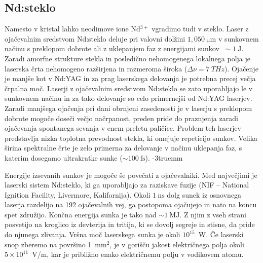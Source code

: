 \subsection{Nd:steklo}
Namesto v kristal lahko neodimove ione Nd$^{3+}$ vgradimo tudi v steklo. 
Laser z ojačevalnim sredstvom Nd:steklo  deluje 
pri valovni dolžini $1,050~\si{\micro\meter}$ v sunkovnem načinu 
s preklopom dobrote ali z uklepanjem faz z energijami sunkov $~\sim 1~\si{\joule}$.
Zaradi amorfne strukture stekla in posledično 
nehomogenega lokalnega polja je laserska črta nehomogeno razširjena in razmeroma široka
($\Delta \nu = 7~\si{THz}$).
Ojačenje je manjše kot v Nd:YAG in za prag laserskega delovanja je
potrebna precej večja črpalna moč. Laserji z ojačevalnim sredstvom Nd:steklo se zato uporabljajo le v 
sunkovnem načinu in za tako delovanje so celo primernejši od Nd:YAG laserjev.
Zaradi manjšega ojačenja pri dani obrnjeni zasedenosti 
je v laserju s preklopom dobrote mogoče doseči večjo načrpanost, preden pride do praznjenja
zaradi ojačevanja spontanega sevanja v enem preletu paličice. Problem teh laserjev
predstavlja nizka toplotna prevodnost stekla, ki omejuje repeticijo sunkov.
Velika širina spektralne črte je zelo primerna za delovanje v načinu uklepanja faz, s 
katerim dosegamo ultrakratke sunke ($\sim 100~\si{\femto\second}$). 
\vglue-3truemm
\begin{remark}
Energije izsevanih sunkov je mogoče še povečati z ojačevalniki. Med največjimi je
laserski sistem Nd:steklo, ki ga uporabljajo za raziskave fuzije (NIF -- National Ignition Facility, 
Livermore, Kalifornija).
Okoli $1~\si{\nano\second}$ dolg sunek iz osnovnega laserja razdelijo na 192
ojačevalnih vej, ga postopoma ojačujejo in nato na koncu spet združijo.
Končna energija sunka je tako nad $\sim 1~\si{\mega\joule}$. Z njim z vseh strani posvetijo na
kroglico iz devterija in tritija, ki se dovolj segreje in stisne, da pride do 
njunega zlivanja. Vršna moč laserskega sunka je okoli $10^{15}$~W. 
Če laserski snop zberemo na površino 1~mm$^2$, je v gorišču jakost električnega polja
okoli $5 \times 10^{11}$~V/m, kar je približno enako električnemu polju v vodikovem atomu.
\end{remark}


